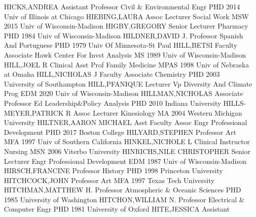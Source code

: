 \documentclass[
]{article}
\begin{document}
 \textbar HICKS,ANDREA \textbar Assistant Professor
\textbar Civil \& Environmental Engr \textbar PHD 2014 Univ of Illinois
at Chicago \textbar{}  \textbar HIEBING,LAURA \textbar Assoc
Lecturer \textbar Social Work \textbar MSW 2015 Univ of
Wisconsin-Madison \textbar{}  \textbar HIGBY,GREGORY
\textbar Senior Lecturer \textbar Pharmacy \textbar PHD 1984 Univ of
Wisconsin-Madison \textbar{}  \textbar HILDNER,DAVID J.
\textbar Professor \textbar Spanish And Portuguese \textbar PHD 1979
Univ Of Minnesota-St Paul \textbar{}  \textbar HILL,BETSI
\textbar Faculty Associate \textbar Hawk Center For Invst Analysis
\textbar MS 1989 Univ of Wisconsin-Madison \textbar{} 
\textbar HILL,JOEL R \textbar Clinical Asst Prof \textbar Family
Medicine \textbar MPAS 1998 Univ of Nebraska at Omaha \textbar{}
 \textbar HILL,NICHOLAS J \textbar Faculty Associate
\textbar Chemistry \textbar PHD 2003 University of Southampton
\textbar{}  \textbar HILL,PFANIQUE \textbar Lecturer
\textbar Vp Diversity And Climate Prog \textbar EDM 2020 Univ of
Wisconsin-Madison \textbar{}  \textbar HILLMAN,NICHOLAS
\textbar Associate Professor \textbar Ed Leadership\&Policy Analysis
\textbar PHD 2010 Indiana University \textbar{} 
\textbar HILLS-MEYER,PATRICK R \textbar Assoc Lecturer
\textbar Kinesiology \textbar MA 2004 Western Michigan University
\textbar{}  \textbar HILTNER,AARON MICHAEL \textbar Asst
Faculty Assoc \textbar Engr Professional Development \textbar PHD 2017
Boston College \textbar{}  \textbar HILYARD,STEPHEN
\textbar Professor \textbar Art \textbar MFA 1997 Univ of Southern
California \textbar{}  \textbar HINKEL,NICHOLE L
\textbar Clinical Instructor \textbar Nursing \textbar MSN 2006 Viterbo
University \textbar{}  \textbar HINRICHS,NILE CHRISTOPHER
\textbar Senior Lecturer \textbar Engr Professional Development
\textbar EDM 1987 Univ of Wisconsin-Madison \textbar{} 
\textbar HIRSCH,FRANCINE \textbar Professor \textbar History
\textbar PHD 1998 Princeton University \textbar{} 
\textbar HITCHCOCK,JOHN \textbar Professor \textbar Art \textbar MFA
1997 Texas Tech University \textbar{} 
\textbar HITCHMAN,MATTHEW H. \textbar Professor \textbar Atmospheric \&
Oceanic Sciences \textbar PHD 1985 University of Washington \textbar{}
 \textbar HITCHON,WILLIAM N. \textbar Professor
\textbar Electrical \& Computer Engr \textbar PHD 1981 University of
Oxford \textbar{}  \textbar HITE,JESSICA \textbar Assistant
\end{document}
